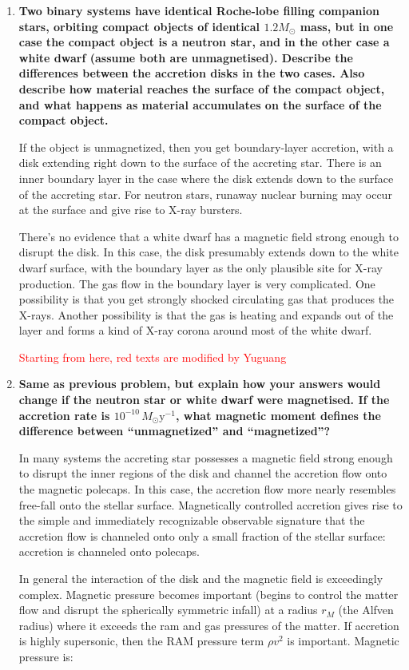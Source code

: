 \documentclass[a4paper]{article}
\begin{document}
\begin{enumerate}
\item \textbf{Two binary systems have identical Roche-lobe filling companion stars, orbiting compact objects of identical $1.2 M_\odot$ mass, but in one case the compact object is a neutron star, and in the other case a white dwarf (assume both are unmagnetised). Describe the differences between the accretion disks in the two cases. Also describe how material reaches the surface of the compact object, and what happens as material accumulates on the surface of the compact object.}

If the object is unmagnetized, then you get boundary-layer accretion, with a disk extending right down to the surface of the accreting star. 
There is an inner boundary layer in the case where the disk extends down to the surface of the accreting star. For neutron stars, runaway nuclear burning may occur at the surface and give rise to X-ray bursters. 

There's no evidence that a white dwarf has a magnetic field strong enough to disrupt the disk. In this case, the disk presumably extends down to the white dwarf surface, with the boundary layer as the only plausible site for X-ray production. The gas flow in the boundary layer is very complicated. One possibility is that you get strongly shocked circulating gas that produces the X-rays. Another possibility is that the gas is heating and expands out of the layer and forms a kind of X-ray corona around most of the white dwarf. 

\textcolor{red}{Starting from here, red texts are modified by Yuguang}
\item \textbf{Same as previous problem, but explain how your answers would change if the neutron star or white dwarf were magnetised. If the accretion rate is $10^{-10}\,M_\odot \mathrm{y}^{-1}$, what magnetic moment defines the difference between “unmagnetized” and “magnetized”?}

In many systems the accreting star possesses a magnetic field strong enough to disrupt the inner regions of the disk and channel the accretion flow onto the magnetic polecaps. In this case, the accretion flow more nearly resembles free-fall onto the stellar surface. Magnetically controlled accretion gives rise to the simple and immediately recognizable observable signature that the accretion flow is channeled onto only a small fraction of the stellar surface: accretion is channeled onto polecaps. 

In general the interaction of the disk and the magnetic field is exceedingly complex. Magnetic pressure becomes important (begins to control the matter flow and disrupt the spherically symmetric infall) at a radius $r_M$ (the Alfven radius) where it exceeds the ram and gas pressures of the matter. If accretion is highly supersonic, then the RAM pressure term $\rho v^2$ is important. Magnetic pressure is:


\end{enumerate}
\end{document}
